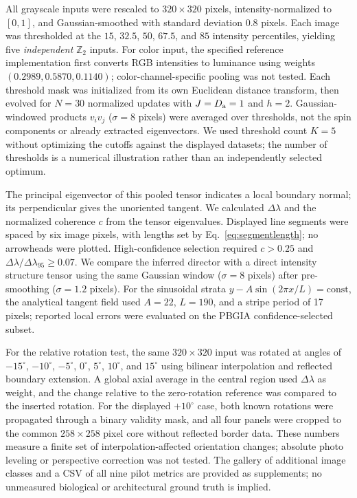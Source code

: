 \documentclass[11pt,a4paper]{article}
\begin{document}
All grayscale inputs were rescaled to $320\times320$ pixels, intensity-normalized to $[0,1]$, and Gaussian-smoothed with standard deviation $0.8$ pixels. Each image was thresholded at the $15$, $32.5$, $50$, $67.5$, and $85$ intensity percentiles, yielding five \emph{independent} $\mathbb Z_2$ inputs. For color input, the specified reference implementation first converts RGB intensities to luminance using weights $(0.2989,0.5870,0.1140)$; color-channel-specific pooling was not tested. Each threshold mask was initialized from its own Euclidean distance transform, then evolved for $N=30$ normalized updates with $J=D_{\rm a}=1$ and $h=2$. Gaussian-windowed products $v_i v_j$ ($\sigma=8$ pixels) were averaged over thresholds, not the spin components or already extracted eigenvectors. We used threshold count $K=5$ without optimizing the cutoffs against the displayed datasets; the number of thresholds is a numerical illustration rather than an independently selected optimum.

The principal eigenvector of this pooled tensor indicates a local boundary normal; its perpendicular gives the unoriented tangent. We calculated $\Delta\lambda$ and the normalized coherence $c$ from the tensor eigenvalues. Displayed line segments were spaced by six image pixels, with lengths set by Eq.~\eqref{eq:segmentlength}; no arrowheads were plotted. High-confidence selection required $c>0.25$ and $\Delta\lambda/\Delta\lambda_{95}\ge0.07$. We compare the inferred director with a direct intensity structure tensor using the same Gaussian window ($\sigma=8$ pixels) after pre-smoothing ($\sigma=1.2$ pixels). For the sinusoidal strata $y-A\sin(2\pi x/L)=\mathrm{const}$, the analytical tangent field used $A=22$, $L=190$, and a stripe period of 17 pixels; reported local errors were evaluated on the PBGIA confidence-selected subset.

For the relative rotation test, the same $320\times320$ input was rotated at angles of $-15^\circ$, $-10^\circ$, $-5^\circ$, $0^\circ$, $5^\circ$, $10^\circ$, and $15^\circ$ using bilinear interpolation and reflected boundary extension. A global axial average in the central region used $\Delta\lambda$ as weight, and the change relative to the zero-rotation reference was compared to the inserted rotation. For the displayed $+10^\circ$ case, both known rotations were propagated through a binary validity mask, and all four panels were cropped to the common $258\times258$ pixel core without reflected border data. These numbers measure a finite set of interpolation-affected orientation changes; absolute photo leveling or perspective correction was not tested. The gallery of additional image classes and a CSV of all nine pilot metrics are provided as supplements; no unmeasured biological or architectural ground truth is implied.
\end{document}
